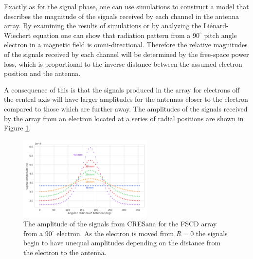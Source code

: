 Exactly as for the signal phase, one can use simulations to construct a model that describes the magnitude of the signals received by each channel in the antenna array. By examining the results of simulations or by analyzing the Li\'{e}nard-Wiechert equation one can show that radiation pattern from a $90^\circ$ pitch angle electron in a magnetic field is omni-directional. Therefore the relative magnitudes of the signals received by each channel will be determined by the free-space power loss, which is proportional to the inverse distance between the assumed electron position and the antenna. 

A consequence of this is that the signals produced in the array for electrons off the central axis will have larger amplitudes for the antennas closer to the electron compared to those which are further away. The amplitudes of the signals received by the array from an electron located at a series of radial positions are shown in Figure \ref{fig:cresana_mags}.
\begin{figure}[htbp]
    \centering
    \includegraphics[width=0.6\textwidth]{figs/Chapter-5/230508_cresana_mags.png}
    \caption{The amplitude of the signals from CRESana for the FSCD array from a $90^\circ$ electron. As the electron is moved from $R=0$ the signals begin to have unequal amplitudes depending on the distance from the electron to the antenna.}
    \label{fig:cresana_mags}
\end{figure}

